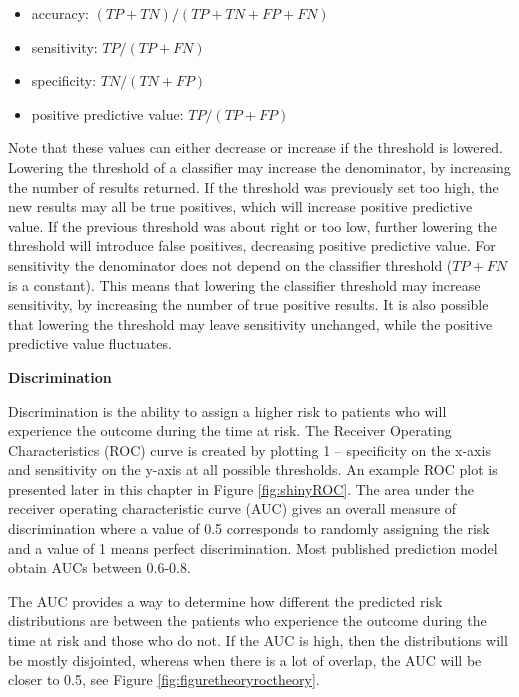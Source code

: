 \documentclass[11pt]{book}
\providecommand{\tightlist}{%
  \setlength{\itemsep}{0pt}\setlength{\parskip}{0pt}}
\theoremstyle{definition}
\theoremstyle{definition}
\theoremstyle{definition}
\theoremstyle{remark}
\begin{document}
\begin{itemize}
\tightlist
\item
  accuracy: \((TP+TN)/(TP+TN+FP+FN)\)
\item
  sensitivity: \(TP/(TP+FN)\)
\item
  specificity: \(TN/(TN+FP)\)
\item
  positive predictive value: \(TP/(TP+FP)\)
\end{itemize}

Note that these values can either decrease or increase if the threshold is lowered. Lowering the threshold of a classifier may increase the denominator, by increasing the number of results returned. If the threshold was previously set too high, the new results may all be true positives, which will increase positive predictive value. If the previous threshold was about right or too low, further lowering the threshold will introduce false positives, decreasing positive predictive value. For sensitivity the denominator does not depend on the classifier threshold (\(TP+FN\) is a constant). This means that lowering the classifier threshold may increase sensitivity, by increasing the number of true positive results. It is also possible that lowering the threshold may leave sensitivity unchanged, while the positive predictive value fluctuates.

\textbf{Discrimination}

Discrimination is the ability to assign a higher risk to patients who will experience the outcome during the time at risk. The Receiver Operating Characteristics (ROC) curve is created by plotting 1 -- specificity on the x-axis and sensitivity on the y-axis at all possible thresholds. An example ROC plot is presented later in this chapter in Figure \ref{fig:shinyROC}. The area under the receiver operating characteristic curve (AUC) gives an overall measure of discrimination where a value of 0.5 corresponds to randomly assigning the risk and a value of 1 means perfect discrimination. Most published prediction model obtain AUCs between 0.6-0.8.   

The AUC provides a way to determine how different the predicted risk distributions are between the patients who experience the outcome during the time at risk and those who do not. If the AUC is high, then the distributions will be mostly disjointed, whereas when there is a lot of overlap, the AUC will be closer to 0.5, see Figure \ref{fig:figuretheoryroctheory}.
\end{document}
